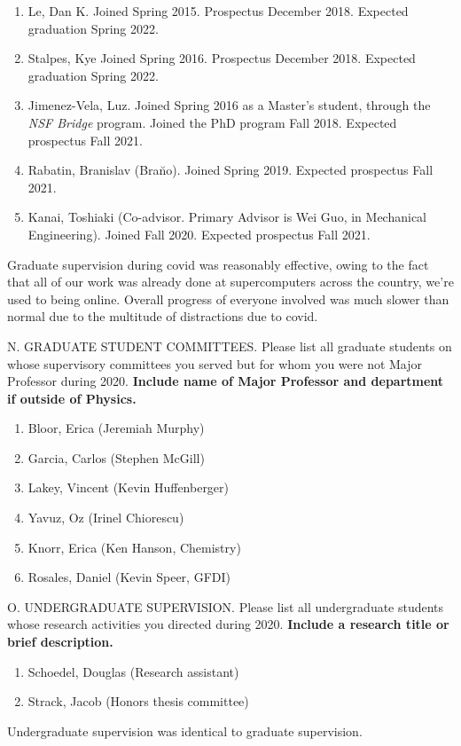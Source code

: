 \begin{enumerate}
    \item Le, Dan K. Joined Spring 2015.  Prospectus December 2018.  Expected
        graduation Spring 2022.
    \item Stalpes, Kye  Joined Spring 2016.  Prospectus December 2018. Expected
        graduation Spring 2022.
    \item Jimenez-Vela, Luz.  Joined Spring 2016 as a Master's student, through
        the \emph{NSF Bridge} program.  Joined the PhD program Fall 2018.
        Expected prospectus Fall 2021.  
    \item Rabatin, Branislav (Bra\u no).  Joined Spring 2019.  Expected
        prospectus Fall 2021.
    \item Kanai, Toshiaki (Co-advisor.  Primary Advisor is Wei Guo, in
        Mechanical Engineering).  Joined Fall 2020.  Expected prospectus Fall
        2021.
\end{enumerate}
Graduate supervision during covid was reasonably effective, owing to the fact
that all of our work was already done at supercomputers across the country,
we're used to being online.  Overall progress of everyone involved was much
slower than normal due to the multitude of distractions due to covid.  

\bigskip

\noindent N. GRADUATE STUDENT COMMITTEES. Please list all graduate
students on whose supervisory committees you served but for whom you
were not Major Professor during 2020. {\bf Include name of Major Professor 
and department if outside of Physics. }
\bigskip

\begin{enumerate}
    \item Bloor, Erica (Jeremiah Murphy)
    \item Garcia, Carlos (Stephen McGill)
    \item Lakey, Vincent (Kevin Huffenberger)
    \item Yavuz, Oz (Irinel Chiorescu)
    \item Knorr, Erica (Ken Hanson, Chemistry)
    \item Rosales, Daniel (Kevin Speer, GFDI)
\end{enumerate}

\noindent O. UNDERGRADUATE SUPERVISION. Please list all
undergraduate students whose research activities you directed during
2020.  {\bf Include a research title or brief description. }
\bigskip

\begin{enumerate}
    \item Schoedel, Douglas (Research assistant)
    \item Strack, Jacob (Honors thesis committee)
\end{enumerate}
Undergraduate supervision was identical to graduate supervision.

